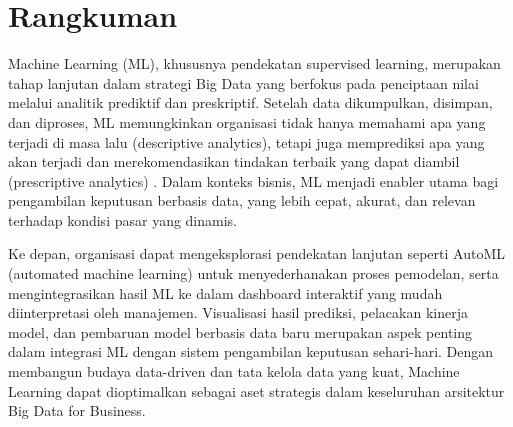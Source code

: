 \section{Rangkuman}

Machine Learning (ML), khususnya pendekatan supervised learning, merupakan tahap lanjutan dalam strategi Big Data yang berfokus pada penciptaan nilai melalui analitik prediktif dan preskriptif. Setelah data dikumpulkan, disimpan, dan diproses, ML memungkinkan organisasi tidak hanya memahami apa yang terjadi di masa lalu (descriptive analytics), tetapi juga memprediksi apa yang akan terjadi dan merekomendasikan tindakan terbaik yang dapat diambil (prescriptive analytics) \cite{provost2013data}. Dalam konteks bisnis, ML menjadi enabler utama bagi pengambilan keputusan berbasis data, yang lebih cepat, akurat, dan relevan terhadap kondisi pasar yang dinamis.

Ke depan, organisasi dapat mengeksplorasi pendekatan lanjutan seperti AutoML (automated machine learning) untuk menyederhanakan proses pemodelan, serta mengintegrasikan hasil ML ke dalam dashboard interaktif yang mudah diinterpretasi oleh manajemen. Visualisasi hasil prediksi, pelacakan kinerja model, dan pembaruan model berbasis data baru merupakan aspek penting dalam integrasi ML dengan sistem pengambilan keputusan sehari-hari. Dengan membangun budaya data-driven dan tata kelola data yang kuat, Machine Learning dapat dioptimalkan sebagai aset strategis dalam keseluruhan arsitektur Big Data for Business.
